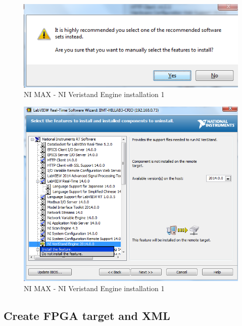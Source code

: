 \documentclass[a4paper,twoside,english]{report}
\begin{document}
\begin{figure}[!h]
\centering \includegraphics[scale=0.45]{Screenshots/Screenshot_2015-01-16_14-20-39.png}
\caption{NI MAX - NI Veristand Engine installation 1}

\label{fig: NI Veristand Engine installation 1-1} 
\end{figure}
\begin{figure}[!h]
\centering \includegraphics[scale=0.45]{Screenshots/Screenshot_2015-01-16_14-21-07.png}
\caption{NI MAX - NI Veristand Engine installation 1}

\label{fig: NI Veristand Engine installation 1-2} 
\end{figure}

\clearpage{}

\subsection{\label{subsec:Create-FPGA-target}Create FPGA target and XML}
\end{document}
